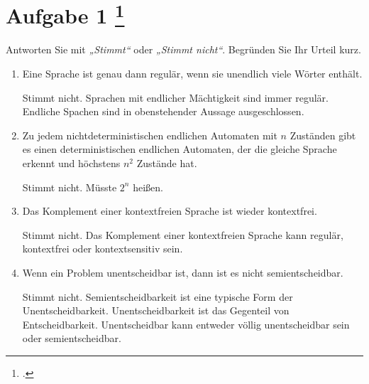 \documentclass{lehramt-informatik-aufgabe}
\begin{document}
\section{Aufgabe 1
\footcite{examen:66115:2020:09}}

Antworten Sie mit \emph{„Stimmt“} oder \emph{„Stimmt nicht“}. Begründen
Sie Ihr Urteil kurz.


\begin{enumerate}


\item Eine Sprache ist genau dann regulär, wenn sie unendlich viele
Wörter enthält.

\begin{liAntwort}
Stimmt nicht. Sprachen mit endlicher Mächtigkeit sind immer regulär.
Endliche Spachen sind in obenstehender Aussage ausgeschlossen.
\end{liAntwort}


\item Zu jedem nichtdeterministischen endlichen Automaten mit $n$
Zuständen gibt es einen deterministischen endlichen Automaten, der die
gleiche Sprache erkennt und höchstens $n^2$ Zustände hat.

\begin{liAntwort}
Stimmt nicht. Müsste $2^n$ heißen.
\end{liAntwort}


\item Das Komplement einer kontextfreien Sprache ist wieder kontextfrei.

\begin{liAntwort}
Stimmt nicht. Das Komplement einer kontextfreien Sprache kann regulär,
kontextfrei oder kontextsensitiv sein.
\end{liAntwort}


\item Wenn ein Problem unentscheidbar ist, dann ist es nicht
semientscheidbar.

\begin{liAntwort}
Stimmt nicht. Semientscheidbarkeit ist eine typische Form der
Unentscheidbarkeit. Unentscheidbarkeit ist das Gegenteil von
Entscheidbarkeit. Unentscheidbar kann entweder völlig unentscheidbar
sein oder semientscheidbar.
\end{liAntwort}


\end{enumerate}
\end{document}
